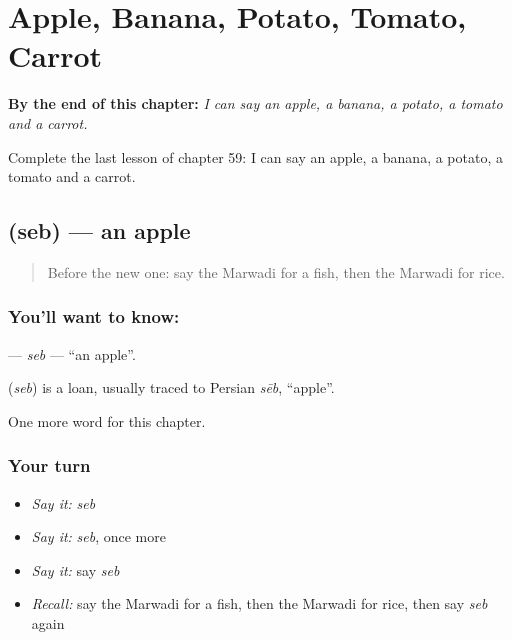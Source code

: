 
\chapter{Apple, Banana, Potato, Tomato, Carrot}
\label{ch:mw-apple-banana-potato-tomato-carrot}

\begin{chapteropening}
\textbf{By the end of this chapter:} \emph{I can say an apple, a banana, a potato, a tomato and a carrot.}

Complete the last lesson of chapter 59: I can say an apple, a banana, a potato, a tomato and a carrot.
\end{chapteropening}

\section[\texorpdfstring{\mw{सेब} (seb)}{सेब (seb)}]{ (seb) — an apple}

\label{lesson:MW-C59-seb}



\begin{quote}
Before the new one: say the Marwadi for a fish, then the Marwadi for rice.
\end{quote}

\subsection*{You'll want to know: }
\textbf{} — \emph{seb} — \textquotedblleft{}an apple\textquotedblright{}.

\begin{cousinweb}
\textbf{} (\emph{seb}) is a loan, usually traced to Persian \emph{sēb}, \textquotedblleft{}apple\textquotedblright{}.
\end{cousinweb}

\begin{grammarlens}[title={What you've built}]
One more word for this chapter.
\end{grammarlens}

\subsection*{Your turn}
\begin{itemize}
\raggedright
  \item \emph{Say it:} \emph{seb}
  \item \emph{Say it:} \emph{seb}, once more
  \item \emph{Say it:} say \emph{seb}
  \item \emph{Recall:} say the Marwadi for a fish, then the Marwadi for rice, then say \emph{seb} again
\end{itemize}

